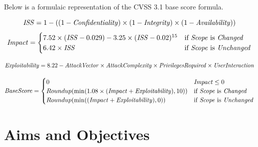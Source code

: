 \documentclass[12pt]{article}
\begin{document}
Below is a formulaic representation of the CVSS 3.1 base score formula.
	{\scriptsize
		\begin{equation}
			\mathit{ISS} = 1 - ((1 - \mathit{Confidentiality}) \times (1 - \mathit{Integrity}) \times (1 - \mathit{Availability})) \\
		\end{equation}
		\begin{equation}
			\mathit{Impact} =
			\begin{cases}
				7.52 \times (\mathit{ISS} - 0.029) - 3.25 \times (\mathit{ISS} - 0.02)^{15} & \text{if \textit{Scope} is
				\textit{Changed}}                                                                                        \\
				6.42 \times \mathit{ISS}                                                    & \text{if \textit{Scope} is
					\textit{Unchanged}}
			\end{cases}
		\end{equation}

		\begin{equation}
			\mathit{Exploitability} = 8.22 - \mathit{AttackVector} \times \mathit{AttackComplexity} \times \mathit{PrivilegesRequired} \times
			\mathit{UserInteraction} \\
		\end{equation}

		\begin{equation}
			\mathit{BaseScore} =
			\begin{cases}
				0                                                                          & \mathit{Impact} \leq 0     \\
				Roundup(\min(1.08 \times (\mathit{Impact} + \mathit{Exploitability}), 10)) & \text{if \textit{Scope} is
				\textit{Changed}}                                                                                       \\
				Roundup(\min((\mathit{Impact} + \mathit{Exploitability}), 0))              & \text{if \textit{Scope} is
				\textit{Unchanged}}                                                                                     \\
			\end{cases}
		\end{equation}
	}


\unappendix
\section{Aims and Objectives}
\end{document}
